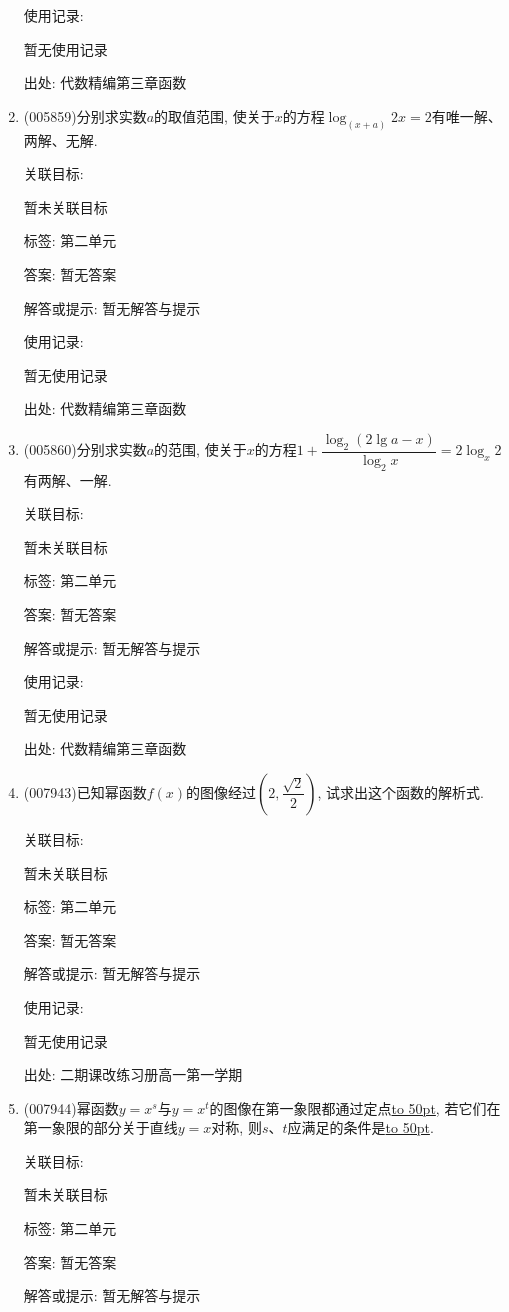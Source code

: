 \documentclass[10pt,a4paper]{article}
\newcommand{\blank}[1]{\underline{\hbox to #1pt{}}}
\begin{document}
\begin{enumerate}[1.]
使用记录:

暂无使用记录


出处: 代数精编第三章函数
\item { (005859)}分别求实数$a$的取值范围, 使关于$x$的方程$\log_{(x+a)}2x=2$有唯一解、两解、无解.


关联目标:

暂未关联目标



标签: 第二单元

答案: 暂无答案

解答或提示: 暂无解答与提示

使用记录:

暂无使用记录


出处: 代数精编第三章函数
\item { (005860)}分别求实数$a$的范围, 使关于$x$的方程$1+\dfrac{\log_2(2\lg a-x)}{\log_2x}=2\log_x2$有两解、一解.


关联目标:

暂未关联目标



标签: 第二单元

答案: 暂无答案

解答或提示: 暂无解答与提示

使用记录:

暂无使用记录


出处: 代数精编第三章函数
\item { (007943)}已知幂函数$f(x)$的图像经过$(2,\dfrac{\sqrt 2}2)$, 试求出这个函数的解析式.


关联目标:

暂未关联目标



标签: 第二单元

答案: 暂无答案

解答或提示: 暂无解答与提示

使用记录:

暂无使用记录


出处: 二期课改练习册高一第一学期
\item { (007944)}幂函数$y=x^s$与$y=x^t$的图像在第一象限都通过定点\blank{50}, 若它们在第一象限的部分关于直线$y=x$对称, 则$s$、$t$应满足的条件是\blank{50}.


关联目标:

暂未关联目标



标签: 第二单元

答案: 暂无答案

解答或提示: 暂无解答与提示


\end{enumerate}
\end{document}
